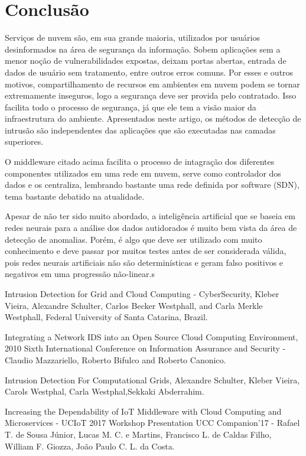 \documentclass[journal]{IEEEtran}
\begin{document}
\section{Conclusão}
Serviços de nuvem são, em sua grande maioria, utilizados por usuários desinformados na área de segurança da informação. Sobem aplicações sem a menor noção de vulnerabilidades expostas, deixam portas abertas, entrada de dados de usuário sem tratamento, entre outros erros comuns. Por esses e outros motivos, compartilhamento de recursos em ambientes em nuvem podem se tornar extremamente inseguros, logo a segurança deve ser provida pelo contratado. Isso facilita todo o processo de segurança, já que ele tem a visão maior da infraestrutura do ambiente. Apresentados neste artigo, os métodos de detecção de intrusão são independentes das aplicações que são executadas nas camadas superiores. \par
O middleware citado acima facilita o processo de intagração dos diferentes componentes utilizados em uma rede em nuvem, serve como controlador dos dados e os centraliza, lembrando bastante uma rede definida por software (SDN), tema bastante debatido na atualidade. \par
Apesar de não ter sido muito abordado, a inteligência artificial que se baseia em redes neurais para a análise dos dados autidorados é muito bem vista da área de detecção de anomalias. Porém, é algo que deve ser utilizado com muito conhecimento e deve passar por muitos testes antes de ser considerada válida, pois redes neurais artificiais não são determinísticas e geram falso positivos e negativos em uma progressão não-linear.s

\begin{thebibliography}{1}

Intrusion Detection for Grid and Cloud Computing - CyberSecurity, Kleber Vieira, Alexandre Schulter, Carlos Becker Westphall, and Carla Merkle Westphall, Federal University of Santa Catarina, Brazil.

Integrating a Network IDS into an Open Source Cloud Computing Environment, 2010 Sixth International Conference on Information Assurance and Security - Claudio Mazzariello, Roberto Bifulco and Roberto Canonico.

Intrusion Detection For Computational Grids, Alexandre Schulter, Kleber Vieira, Carols Westphal, Carla Westphal,Sekkaki Abderrahim.

Increasing the Dependability of IoT Middleware with Cloud Computing and Microservices - UCIoT 2017 Workshop Presentation UCC Companion’17 - Rafael T. de Sousa Júnior, Lucas M. C. e Martins, Francisco L. de Caldas Filho, William F. Giozza, João Paulo C. L. da Costa.

\end{thebibliography}
\end{document}
